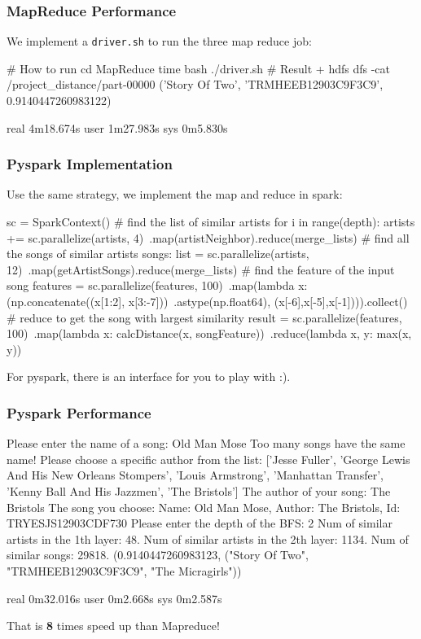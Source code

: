 \documentclass{beamer}
\begin{document}
\begin{frame}[fragile]

\frametitle{MapReduce Performance}

We implement a \verb|driver.sh| to run the three map reduce job:

\begin{bashcode}
# How to run
cd MapReduce
time bash ./driver.sh
# Result
+ hdfs dfs -cat /project_distance/part-00000
('Story Of Two', 'TRMHEEB12903C9F3C9', 0.9140447260983122)

real    4m18.674s
user    1m27.983s
sys     0m5.830s
\end{bashcode}

\end{frame}

\begin{frame}[fragile]

\frametitle{Pyspark Implementation}

Use the same strategy, we implement the map and reduce in spark:
\begin{mycodetiny}
sc = SparkContext()
# find the list of similar artists
for i in range(depth):
    artists += sc.parallelize(artists, 4)\
               .map(artistNeighbor).reduce(merge_lists)
# find all the songs of similar artists 
songs: list = sc.parallelize(artists, 12)\ 
              .map(getArtistSongs).reduce(merge_lists)
# find the feature of the input song
features = sc.parallelize(features, 100)\
             .map(lambda x: (np.concatenate((x[1:2], x[3:-7]))\
             .astype(np.float64), (x[-6],x[-5],x[-1]))).collect()
# reduce to get the song with largest similarity
result = sc.parallelize(features, 100)\
           .map(lambda x: calcDistance(x, songFeature))\
           .reduce(lambda x, y: max(x, y))
\end{mycodetiny}
For pyspark, there is an interface for you to play with :).
\end{frame}

\begin{frame}[fragile]

\frametitle{Pyspark Performance}

\begin{bashcodetiny}
Please enter the name of a song:  Old Man Mose
Too many songs have the same name! Please choose a specific author from the list: 
['Jesse Fuller', 'George Lewis And His New Orleans Stompers', 'Louis Armstrong', 'Manhattan Transfer', 'Kenny Ball And His Jazzmen', 'The Bristols']
The author of your song: The Bristols
The song you choose: 
Name: Old Man Mose, Author: The Bristols, Id: TRYESJS12903CDF730
Please enter the depth of the BFS: 2
Num of similar artists in the 1th layer: 48.
Num of similar artists in the 2th layer: 1134.
Num of similar songs: 29818.
(0.9140447260983123, ("Story Of Two", "TRMHEEB12903C9F3C9", "The Micragirls"))

real    0m32.016s
user    0m2.668s
sys     0m2.587s
\end{bashcodetiny}

That is \textbf{8} times speed up than Mapreduce!
\end{frame}
\end{document}
